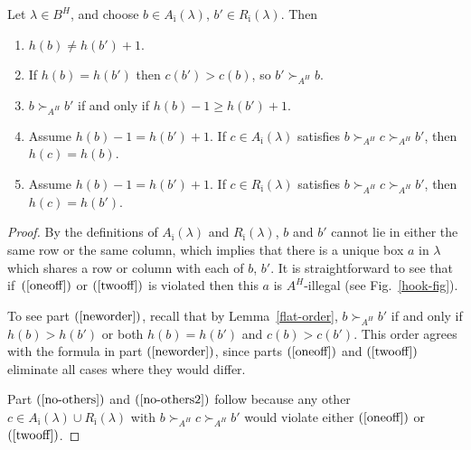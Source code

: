 \begin{Lemma} \label{when-illegal}
Let $\lambda \in B^H$, and choose $b \in A_{\bar \imath}(\lambda)$, $b' \in R_{\bar \imath}(\lambda)$. Then
\begin{enumerate}\itemsep=0pt
\item \label{oneoff} $h(b) \neq h(b')+1$.

\item \label{twooff} If $h(b)= h(b')$ then $c(b') >c(b)$, so $b' \succ_{A^H} b$.


\item \label{neworder} $b \succ_{A^H} b'$ if and only if $h(b)-1 \geq h(b')+1$.

\item \label{no-others} Assume $h(b)-1=h(b')+1$. If $c \in A_{\bar \imath}(\lambda)$ satisfies $b \succ_{A^H} c \succ_{A^H} b'$, then $h(c)=h(b)$.

\item \label{no-others2} Assume $h(b)-1=h(b')+1$. If $c \in R_{\bar \imath}(\lambda)$ satisfies $b \succ_{A^H} c \succ_{A^H} b'$, then $h(c)=h(b')$.
\end{enumerate}
\end{Lemma}

\begin{proof}
By the def\/initions of $A_{\bar \imath}(\lambda)$ and $R_{\bar \imath}(\lambda)$, $b$ and $b'$ cannot lie in either the same row or the same column, which implies that there is a unique box $a$ in $\lambda$ which shares a row or column with each of $b$, $b'$. It is straightforward to see that  if~$(\ref{oneoff})$ or $(\ref{twooff})$ is violated then this $a$ is $A^H$-illegal (see Fig.~\ref{hook-fig}).

To see part $(\ref{neworder})$, recall that by Lemma~\ref{flat-order}, $b \succ_{A^H} b'$ if and only if $h(b) > h(b')$ or both $h(b)=h(b')$ and $c(b)> c(b')$. This order agrees with the formula in part $(\ref{neworder})$, since parts $(\ref{oneoff})$ and $(\ref{twooff})$ eliminate all cases where they would dif\/fer.

Part $(\ref{no-others})$ and $(\ref{no-others2})$ follow because any other $c \in A_{\bar \imath}(\lambda) \cup R_{\bar \imath}(\lambda)$ with $b \succ_{A^H} c \succ_{A^H} b'$ would violate either $(\ref{oneoff})$ or $(\ref{twooff})$.
\end{proof}


